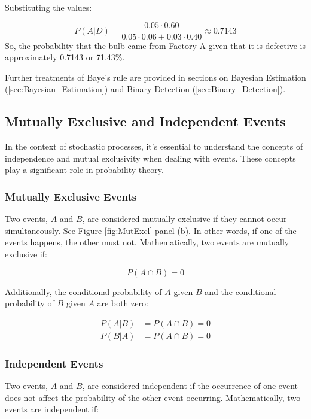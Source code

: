 \documentclass[12pt]{book}
\theoremstyle{definition}
\begin{document}
Substituting the values:

\[
P(A | D) = \frac{0.05 \cdot 0.60}{0.05 \cdot 0.06 + 0.03 \cdot 0.40} \approx 0.7143
\]
So, the probability that the bulb came from Factory A given that it is defective is approximately 0.7143 or 71.43\%.

\bigskip

Further treatments of Baye's rule are provided in sections on Bayesian Estimation (\ref{sec:Bayesian_Estimation}) and Binary Detection (\ref{sec:Binary_Detection}).

\subsection{Mutually Exclusive and Independent Events}

In the context of stochastic processes, it's essential to understand the concepts of independence and mutual exclusivity when dealing with events. These concepts play a significant role in probability theory.


\subsubsection{Mutually Exclusive Events}


Two events, \(A\) and \(B\), are considered mutually exclusive if they cannot occur simultaneously. See Figure \ref{fig:MutExcl} panel (b). In other words, if one of the events happens, the other must not. Mathematically, two events are mutually exclusive if:

\[
P(A \cap B) = 0
\]

Additionally, the conditional probability of \(A\) given \(B\) and the conditional probability of \(B\) given \(A\) are both zero:

\[
\begin{aligned}
    P(A | B) & = P(A \cap B) = 0 \\
    P(B | A) & = P(A \cap B) = 0    
\end{aligned}
\]


\subsubsection{Independent Events}

Two events, \(A\) and \(B\), are considered independent if the occurrence of one event does not affect the probability of the other event occurring. Mathematically, two events are independent if:
\end{document}
